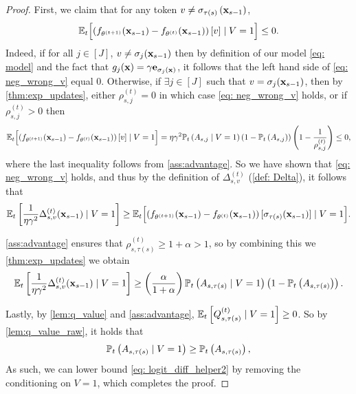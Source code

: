 \documentclass{article}
\theoremstyle{plain}
\theoremstyle{definition}
\theoremstyle{remark}
\begin{document}
\begin{proof}
    First, we claim that for any token $v \neq \sigma_{\tau(s)}\left(\bx_{s-1}\right)$, 
    \begin{align}\label{eq: neg_wrong_v}
        \E_{t}\Bigl[\left(f_{\theta^{(t+1)}}(\bx_{s-1}) - f_{\theta^{(t)}}(\bx_{s-1})\right)[v] \mid V=1\Bigr] \leq 0.
    \end{align}
    Indeed, if for all $j\in[J]$, $v \neq \sigma_j(\bx_{s-1})$ then by definition of our model \eqref{eq: model} and the fact that $g_j(\bx) = \gamma\be_{\sigma_j(\bx)}$, it follows that the left hand side of \eqref{eq: neg_wrong_v} equal $0$. Otherwise, if $\exists j\in [J]$ such that $v = \sigma_j(\bx_{s-1})$, then by \cref{thm:exp_updates}, either $\rho_{s, j}^{(t)} = 0$ in which case \eqref{eq: neg_wrong_v} holds, or if $\rho_{s, j}^{(t)} > 0$ then
    \begin{align}
        \E_{t}\Bigl[\left(f_{\theta^{(t+1)}}(\bx_{s-1}) - f_{\theta^{(t)}}(\bx_{s-1})\right)[v] \mid V=1\Bigr] = \eta \gamma^2 \P_t\left(A_{s,j} \mid V=1\right)\left(1 - \P_t\left(A_{s,j}\right)\right)\left(1 - \frac{1}{\rho_{s, j}^{(t)}}\right) \leq 0,
    \end{align}
    where the last inequality follows from \cref{ass:advantage}. So we have shown that \eqref{eq: neg_wrong_v} holds, and thus by the definition of $\Delta^{(t)}_{s, v}$ (\cref{def: Delta}), it follows that 
    \begin{align*}
        \E_t\left[\frac{1}{\eta \gamma^2} \Delta^{(t)}_{s, v}( \bx_{s-1}) \mid V=1\right] \geq \E_{t}\Bigl[\left(f_{\theta^{(t+1)}}(\bx_{s-1}) - f_{\theta^{(t)}}(\bx_{s-1})\right)[\sigma_{\tau(s)}(\bx_{s-1})] \mid V=1\Bigr].
    \end{align*}

    \cref{ass:advantage} ensures that $\rho_{s, \tau(s)}^{(t)} \geq 1 + \alpha > 1$, so by combining this we \cref{thm:exp_updates} we obtain 
    \begin{align}\label{eq: logit_diff_helper2}
        \E_t\left[\frac{1}{\eta \gamma^2} \Delta^{(t)}_{s, v}( \bx_{s-1}) \mid V=1\right] \geq \left(\frac{\alpha}{1+\alpha}\right) \P_t\left(A_{s, \tau(s)}  \mid V=1\right)\left(1 - \P_t\left(A_{s, \tau(s)} \right)\right). 
    \end{align}
    
    Lastly, by \cref{lem:q_value} and \cref{ass:advantage}, $\E_t\left[Q^{(t)}_{s, \tau(s)}\mid V=1\right] \geq 0$. So by \cref{lem:q_value_raw}, it holds that 
    \begin{align*}
        \P_t\left(A_{s, \tau(s)}  \mid V = 1\right) \geq \P_t\left(A_{s, \tau(s)} \right),
    \end{align*}
    As such, we can lower bound \eqref{eq: logit_diff_helper2} by removing the conditioning on $V = 1$, which completes the proof.
\end{proof}
\end{document}

